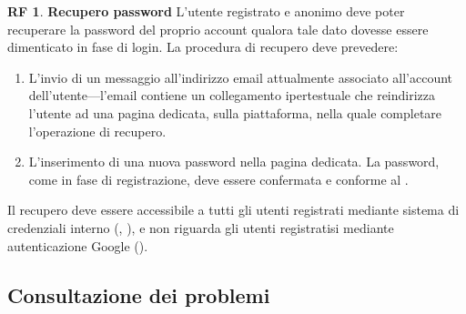 \documentclass[11pt, a4paper]{article}
\theoremstyle{definition}
\newtheorem{funcreq}{RF} %
\begin{document}
\begin{funcreq}
\label{savepassword}
\textbf{Recupero password }
L'utente registrato e anonimo deve poter recuperare la password del proprio
account qualora tale dato dovesse essere dimenticato in fase di login. La
procedura di recupero deve prevedere:
\begin{enumerate}
    \item L'invio di un messaggio all'indirizzo email attualmente associato
    all'account dell'utente—l'email contiene un collegamento ipertestuale
    che reindirizza l'utente ad una pagina dedicata, sulla piattaforma, nella
    quale completare l'operazione di recupero.

    \item L'inserimento di una nuova password nella pagina dedicata. La password, come in fase di
    registrazione, deve essere confermata e conforme al \textcolor{blue}{}.
\end{enumerate}
Il recupero deve essere accessibile a tutti gli utenti registrati mediante
sistema di credenziali interno (\textcolor{blue}{}, \textcolor{blue}{}),
e non riguarda gli utenti registratisi mediante autenticazione Google
(\textcolor{blue}{}).
\end{funcreq}

\subsection{Consultazione dei problemi}\label{consultaprobl}
\end{document}
